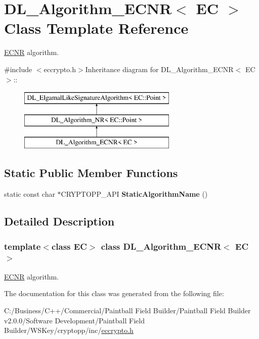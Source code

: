 \hypertarget{class_d_l___algorithm___e_c_n_r}{
\section{DL\_\-Algorithm\_\-ECNR$<$ EC $>$ Class Template Reference}
\label{class_d_l___algorithm___e_c_n_r}
}


\hyperlink{struct_e_c_n_r}{ECNR} algorithm.  


{\ttfamily \#include $<$eccrypto.h$>$}Inheritance diagram for DL\_\-Algorithm\_\-ECNR$<$ EC $>$::\begin{figure}[H]
\begin{center}
\leavevmode
\includegraphics[height=3cm]{class_d_l___algorithm___e_c_n_r}
\end{center}
\end{figure}
\subsection*{Static Public Member Functions}
\begin{DoxyCompactItemize}
\item 
\hypertarget{class_d_l___algorithm___e_c_n_r_ac8b191eac8a3dd0a7ee3fb4700dd51f2}{
static const char $\ast$CRYPTOPP\_\-API {\bfseries StaticAlgorithmName} ()}
\label{class_d_l___algorithm___e_c_n_r_ac8b191eac8a3dd0a7ee3fb4700dd51f2}

\end{DoxyCompactItemize}


\subsection{Detailed Description}
\subsubsection*{template$<$class EC$>$ class DL\_\-Algorithm\_\-ECNR$<$ EC $>$}

\hyperlink{struct_e_c_n_r}{ECNR} algorithm. 

The documentation for this class was generated from the following file:\begin{DoxyCompactItemize}
\item 
C:/Business/C++/Commercial/Paintball Field Builder/Paintball Field Builder v2.0.0/Software Development/Paintball Field Builder/WSKey/cryptopp/inc/\hyperlink{eccrypto_8h}{eccrypto.h}\end{DoxyCompactItemize}
